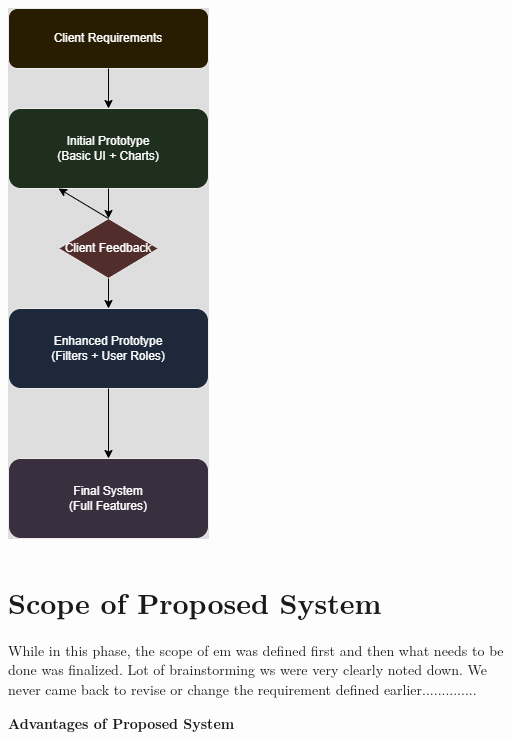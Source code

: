 
\includegraphics[scale=0.8]{Ch2/Prototype1.png}

\label{fig:Prototype Model}


\section{Scope of Proposed System}
While in this phase, the scope of em was defined first and then what needs to be done was finalized. Lot of brainstorming ws were very clearly noted down. 
We never came back to revise or change the requirement defined earlier..............

\textbf{Advantages of Proposed System }\\





